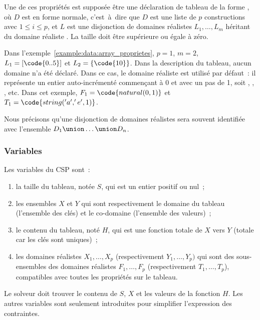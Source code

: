 Une de ces propriétés est supposée être une déclaration de tableau de la forme
, où $D$ est en forme normale, c'est~à~dire que $D$ est
une liste de $p$ constructions  avec $1 \leq i \leq
p$, et $L$ est une disjonction de domaines réalistes $L_1, \dots, L_m$ héritant
du domaine réaliste . La taille doit être supérieure ou égale à
zéro.

Dans l'exemple~\ref{example:data:array_proprietes}, $p = 1$, $m = 2$, $L_1 =
[\code{0..5}]$ et $L_2 = \{\code{10}\}$. Dans la description du tableau, aucun
domaine n'a été déclaré. Dans ce cas, le domaine réaliste 
est utilisé par défaut~: il représente un entier auto-incrémenté commençant à 0
et avec un pas de 1, soit , , ,  etc. Dans cet
exemple, $F_1 = \code{natural(0, 1)}$ et $T_1 = \code{string('a', 'e', 1)}$.

Nous précisons qu'une disjonction de domaines réalistes  sera souvent identifiée avec l'ensemble $D_1 \union \dots \union D_n$.

\subsubsection{Variables}

Les variables du CSP sont~:
%
\begin{enumerate}

\item la taille du tableau, notée $S$, qui est un entier positif ou nul~;

\item les ensembles $X$ et $Y$ qui sont respectivement le domaine du tableau
(l'ensemble des clés) et le co-domaine (l'ensemble des valeurs)~;

\item le contenu du tableau, noté $H$, qui est une fonction totale de $X$ vers
$Y$ (totale car les clés sont uniques)~;

\item les domaines réalistes $X_1, \dots, X_p$ (respectivement $Y_1, \dots,
Y_p)$ qui sont des sous-ensembles des domaines réalistes $F_1, \dots, F_p$
(respectivement $T_1, \dots, T_p$), compatibles avec toutes les propriétés sur
le tableau.

\end{enumerate}

Le solveur doit trouver le contenu de $S$, $X$ et les valeurs de la fonction
$H$. Les autres variables sont seulement introduites pour simplifier
l'expression des contraintes.

